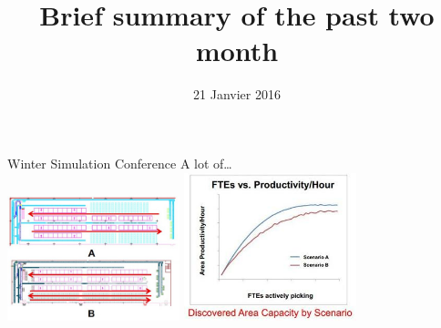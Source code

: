 \documentclass[9pt, handout=show,notes=show]{beamer}
\title{Brief summary of the past two month}
\date{21 Janvier 2016}
\begin{document}
\begin{frame}{ Winter Simulation Conference}
    A lot of\dots\\
    \includegraphics[width=5cm]{images/op.jpg}
    \includegraphics[width=5cm]{images/optimization.jpg}

    
\end{frame}
\end{document}
